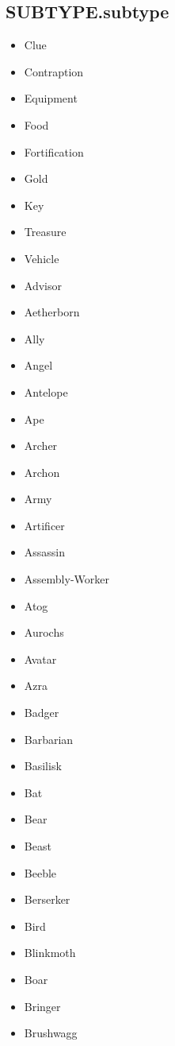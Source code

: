 \documentclass{article}
\begin{document}
\subsection{SUBTYPE.subtype}
\begin{multicols}{3}
    \begin{itemize}
        \item Clue
        \item Contraption
        \item Equipment
        \item Food
        \item Fortification
        \item Gold
        \item Key
        \item Treasure
        \item Vehicle
        \item Advisor
        \item Aetherborn
        \item Ally
        \item Angel
        \item Antelope
        \item Ape
        \item Archer
        \item Archon
        \item Army
        \item Artificer
        \item Assassin
        \item Assembly-Worker
        \item Atog
        \item Aurochs
        \item Avatar
        \item Azra
        \item Badger
        \item Barbarian
        \item Basilisk
        \item Bat
        \item Bear
        \item Beast
        \item Beeble
        \item Berserker
        \item Bird
        \item Blinkmoth
        \item Boar
        \item Bringer
        \item Brushwagg

\end{itemize}
\end{multicols}
\end{document}
